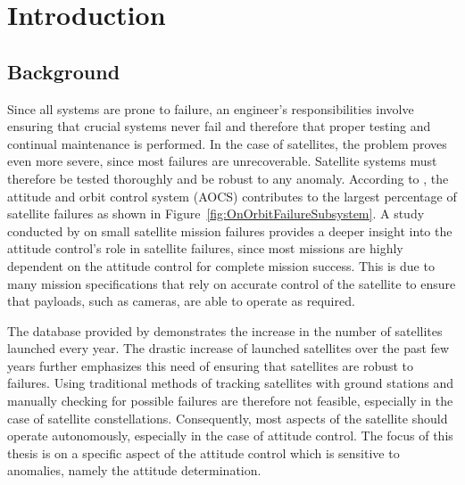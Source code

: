 %
%


\chapter{Introduction}
\label{chap:Introduction}
\section{Background}
Since all systems are prone to failure, an engineer's responsibilities involve ensuring that crucial systems never fail and therefore that proper testing and continual maintenance is performed. In the case of satellites, the problem proves even more severe, since most failures are unrecoverable. Satellite systems must therefore be tested thoroughly and be robust to any anomaly. According to \cite{tafazoli2009study}, the attitude and orbit control system (AOCS) contributes to the largest percentage of satellite failures as shown in Figure~\ref{fig:OnOrbitFailureSubsystem}. A study conducted by \cite{Jacklin2019} on small satellite mission failures provides a deeper insight into the attitude control's role in satellite failures, since most missions are highly dependent on the attitude control for complete mission success. This is due to many mission specifications that rely on accurate control of the satellite to ensure that payloads, such as cameras, are able to operate as required.


\begin{figure*}[!htb]
	\centering
	\caption{On-orbit failure per subsystem \cite{tafazoli2009study}}
	\label{fig:OnOrbitFailureSubsystem}
\end{figure*}

The database provided by \cite{swartwout2015cubesat} demonstrates the increase in the number of satellites launched every year. The drastic increase of launched satellites over the past few years further emphasizes this need of ensuring that satellites are robust to failures. Using traditional methods of tracking satellites with ground stations and manually checking for possible failures are therefore not feasible, especially in the case of satellite constellations. Consequently, most aspects of the satellite should operate autonomously, especially in the case of attitude control. The focus of this thesis is on a specific aspect of the attitude control which is sensitive to anomalies, namely the attitude determination. 

